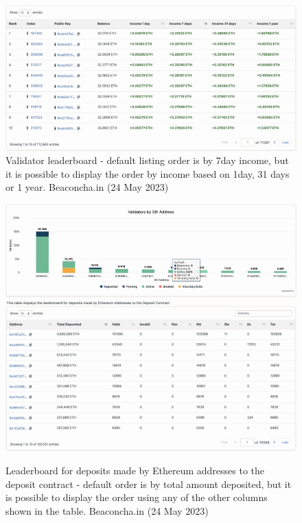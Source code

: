 \documentclass[UTF8]{article}
\begin{document}
\begin{figure}[htbp]
\begin{center}
\includegraphics[width=0.9\linewidth]{images/bvalleader}
\caption{Validator leaderboard - default listing order is by 7day income, but it is possible to display the order by income based on 1day, 31 days or 1 year. Beaconcha.in (24 May 2023)}
\label{fig:bvalleader}
\end{center}
\end{figure}

\begin{figure}[htbp]
\begin{center}
\includegraphics[width=0.9\linewidth]{images/bdeplead}\\
\includegraphics[width=0.9\linewidth]{images/bdepleadtbl}
\caption{Leaderboard for deposits made by Ethereum addresses to the deposit contract - default order is by total amount deposited, but it is possible to display the order using any of the other columns shown in the table. Beaconcha.in (24 May 2023)}
\label{fig:bdepleadtbl}
\end{center}
\end{figure}
\end{document}
